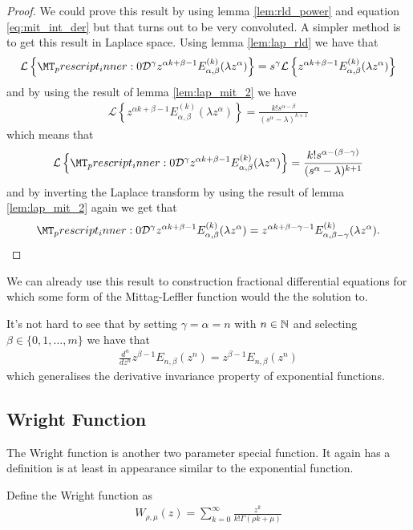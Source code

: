 \begin{proof}
    We could prove this result by using lemma \ref{lem:rld_power} and equation \eqref{eq:mit_int_der} but that turns out to be very convoluted. A simpler method is to get this result in Laplace space.
    Using lemma \ref{lem:lap_rld} we have that 
    \begin{align}
        \mathcal{L}\left\{ \prescript{}{0}{\mathcal{D}}^\gamma z^{\alpha k+\beta-1}E_{\alpha,\beta}^{(k)}(\lambda z^\alpha) \right\} = s^\gamma \mathcal{L}\left\{z^{\alpha k+\beta-1}E_{\alpha,\beta}^{(k)}(\lambda z^\alpha) \right\}
    \end{align}
    and by using the result of lemma \ref{lem:lap_mit_2} we have
    \begin{align}
        \mathcal{L}\left\{z^{\alpha k+\beta-1}E_{\alpha,\beta}^{(k)}(\lambda z^\alpha) \right\} = \frac{k!s^{\alpha - \beta}}{(s^\alpha - \lambda)^{k+1}}
    \end{align}
    which means that
    \begin{align}
        \mathcal{L}\left\{ \prescript{}{0}{\mathcal{D}}^\gamma z^{\alpha k+\beta-1}E_{\alpha,\beta}^{(k)}(\lambda z^\alpha) \right\} = \frac{k!s^{\alpha - (\beta - \gamma)}}{(s^\alpha - \lambda)^{k+1}}
    \end{align}
    and by inverting the Laplace transform by using the result of lemma \ref{lem:lap_mit_2} again we get that
    \begin{align}
        \prescript{}{0}{\mathcal{D}}^\gamma z^{\alpha k+\beta-1}E_{\alpha,\beta}^{(k)}(\lambda z^\alpha) = z^{\alpha k + \beta - \gamma - 1 } E_{\alpha,\beta-\gamma}^{(k)}(\lambda z^\alpha).
    \end{align}
\end{proof}
We can already use this result to construction fractional differential equations for which some form of the Mittag-Leffler function would the the solution to. 

It's not hard to see that by setting $ \gamma = \alpha = n $ with $ n \in \mathbb{N} $ and selecting $ \beta \in \{ 0 , 1, \ldots, m\} $ we have that
\begin{align}
    \frac{d^n}{dz^n} z^{\beta - 1} E_{n,\beta}(z^n) = z^{\beta - 1}E_{n,\beta}(z^n)
\end{align}
which generalises the derivative invariance property of exponential 
functions.

\subsection{Wright Function}

The Wright function is another two parameter special function. It again has a definition is at least in appearance similar to the exponential function. 

\begin{mdframed}[innertopmargin=10pt]
\begin{definition}
Define the Wright function as 
\begin{align}
	W_{\rho, \mu}(z) = \sum_{k=0}^\infty \frac{z^k}{k!\Gamma(\rho k + \mu)}
\end{align}
\end{definition}
\end{mdframed}

\clearpage
